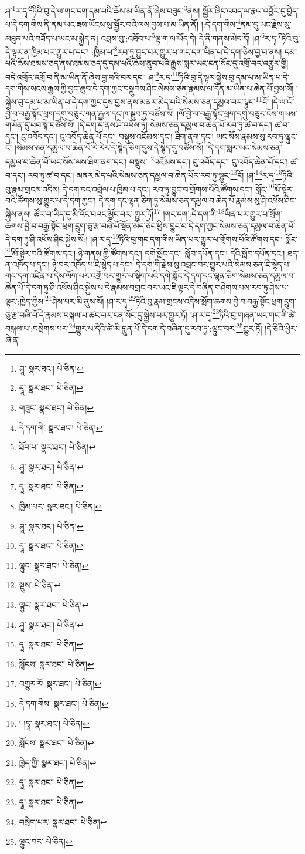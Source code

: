 ཤ་\footnote{ཤཱ་  སྣར་ཐང་།  པེ་ཅིན། }ར་དྭ་\footnote{དྭཱ་  སྣར་ཐང་།  པེ་ཅིན། }ཏིའི་བུ་དེ་ལ་གང་དག་དམ་པའི་ཆོས་མ་ཡིན་ནོ་ཞེས་བཟུང་\footnote{གཟུང་  སྣར་ཐང་།  པེ་ཅིན། }ནས། སྦྱོར་ཞིང་འབད་ལ་རྣལ་འབྱོར་དུ་བྱེད་པ་དེ་དག་གིས་ནི་ནམ་ཡང་ཟས་ཡོངས་སུ་སྦྱོར་བའི་ལས་བྱས་པ་མ་ཡིན་ནོ། །:དེ་དག་གིས་\footnote{དེ་དག་གི་  སྣར་ཐང་།  པེ་ཅིན། }ནམ་དུ་ཡང་རྗེས་སུ་མཐུན་པའི་བཟོད་པ་ཡང་མ་སྐྱེད་ན། འབྲས་བུ་:འཐོབ་པ་\footnote{ཐོབ་པ་  སྣར་ཐང་།  པེ་ཅིན། }ལྟ་ག་ལ་ཡོད་དེ། དེ་ནི་གནས་མེད་དོ། །ཤ་\footnote{ཤཱ་  སྣར་ཐང་།  པེ་ཅིན། }ར་དྭ་\footnote{དྭཱ་  སྣར་ཐང་།  པེ་ཅིན། }ཏིའི་བུ་དེ་ལྟར་ན་ཁྱིམ་པར་གྱུར་པ་དང་། :ཁྱིམ་པ་\footnote{ཁྱིམ་པར་  སྣར་ཐང་།  པེ་ཅིན། }རབ་ཏུ་བྱུང་བར་གྱུར་པ་གང་དག་ཡིན་པ་དེ་དག་ཅེས་བྱ་བ་ནས། དམ་པའི་ཆོས་ཐམས་ཅད་ནས་ཐམས་ཅད་དུ་དམ་པའི་ཆོས་ནུབ་པའི་རྒྱུས་སླར་ཡང་ངན་སོང་དུ་འགྲོ་བར་འགྱུར་གྱི། བདེ་འགྲོར་འགྲོ་བ་ནི་མ་ཡིན་ནོ་ཞེས་བྱ་བའི་བར་དང་། ཤ་\footnote{ཤཱ་  སྣར་ཐང་།  པེ་ཅིན། }ར་དྭ་\footnote{དྭཱ་  སྣར་ཐང་།  པེ་ཅིན། }ཏིའི་བུ་དེ་ལྟར་སྐྱེས་བུ་དམ་པ་མ་ཡིན་པ་དེ་དག་གིས་སངས་རྒྱས་ཀྱི་བྱང་ཆུབ་དེ་དག་ཀྱང་བསྣུབས་ཤིང་སེམས་ཅན་རྣམས་ལ་དོན་མ་ཡིན་པ་ཆེན་པོ་བྱས་སོ། །སྐྱེས་བུ་དམ་པ་མ་ཡིན་པ་དེ་དག་ཀྱང་དུས་བྱས་ནས་མནར་མེད་པའི་སེམས་ཅན་དམྱལ་བར་ལྟུང་\footnote{ལྷུང་  སྣར་ཐང་།  པེ་ཅིན། }ངོ། །དེ་ལ་ལོ་བྱེ་བ་བརྒྱ་སྟོང་ཕྲག་དགུ་བཅུར་གན་རྐྱལ་དང་ཁ་སྦུབ་ཏུ་བཙོས་སོ། །ལོ་བྱེ་བ་བརྒྱ་སྟོང་ཕྲག་དགུ་བཅུར་ངོས་གཡས་གཡོན་དུ་ཕབ་སྟེ་བཙོས་སོ། །དེ་དག་དེ་ནས་ཤི་འཕོས་ཏེ། སེམས་ཅན་དམྱལ་བ་ཆེན་པོ་རབ་ཏུ་ཚ་བ་དང་། ཚ་བ་དང་། ངུ་འབོད་དང་། ངུ་འབོད་ཆེན་པོ་དང་། བསྡུས་འཇོམས་དང་། ཐིག་ནག་དང་། ཡང་སོས་རྣམས་སུ་རབ་ཏུ་ལྟུང་ངོ། །སེམས་ཅན་དམྱལ་བ་ཆེན་པོ་རེ་རེར་དེ་སྙེད་ཅིག་དུས་དེ་སྙེད་དུ་བཙོས་སོ། །དེ་དག་སླར་ཡང་སེམས་ཅན་དམྱལ་བ་ཆེན་པོ་ཡང་སོས་ལས་ཐིག་ནག་དང་། བསྡུས་\footnote{སྡུས་  པེ་ཅིན། }འཇོམས་དང་། ངུ་འབོད་དང་། ངུ་འབོད་ཆེན་པོ་དང་། ཚ་བ་དང་། རབ་ཏུ་ཚ་བ་དང་། མནར་མེད་པའི་སེམས་ཅན་དམྱལ་བ་ཆེན་པོར་རབ་ཏུ་ལྷུང་\footnote{ལྟུང་  སྣར་ཐང་།  པེ་ཅིན། }ངོ། །ཤ་\footnote{ཤཱ་  སྣར་ཐང་།  པེ་ཅིན། }ར་དྭ་\footnote{དྭཱ་  སྣར་ཐང་།  པེ་ཅིན། }ཏིའི་བུ་རྣམ་གྲངས་འདིས། དེ་དག་དང་འབྲེལ་པ་ཁྱིམ་པ་དང་། རབ་ཏུ་བྱུང་བ་གྲོགས་པོའི་ཚོགས་དང་། སློང་\footnote{སློངས་  སྣར་ཐང་།  པེ་ཅིན། }མོ་སྟེར་བའི་ཚོགས་སུ་གྱུར་པ་དེ་དག་ཀྱང་། དེ་དག་དང་ལྷན་ཅིག་ཏུ་སེམས་ཅན་དམྱལ་བ་ཆེན་པོ་རྣམས་སུ་ཤི་འཕོས་ཤིང་སྐྱེས་ནས། ཚོར་བ་ཡིད་དུ་མི་འོང་བའང་མྱོང་བར་:གྱུར་ཏོ།\footnote{འགྱུར་རོ།  སྣར་ཐང་།  པེ་ཅིན། } །གང་དག་:དེ་དག་གི་\footnote{དེ་དག་གིས་  སྣར་ཐང་།  པེ་ཅིན། }ཡིན་པར་གྱུར་པ་སྲོག་ཆགས་བྱེ་བ་བརྒྱ་སྟོང་ཕྲག་དྲུག་ཅུ་རྩ་བཞི་པོ་སྔོན་མེད་ཅིང་ཕྱིས་བྱུང་བ་དེ་དག་ཀྱང་སེམས་ཅན་དམྱལ་བ་ཆེན་པོ་དེ་དག་ཏུ་ཤི་འཕོས་ཤིང་སྐྱེས་སོ:། །ཤ་ར་དྭ་\footnote{། །དྭཱ་  སྣར་ཐང་།  པེ་ཅིན། }ཏིའི་བུ་གང་དག་གིས་ཡིན་པར་གྱུར་པ་གྲོགས་པོའི་ཚོགས་དང་། སློང་\footnote{སློངས་  སྣར་ཐང་།  པེ་ཅིན། }མོ་སྟེར་བའི་ཚོགས་དང་། ཉེ་གནས་ཀྱི་ཚོགས་དང་། དགེ་སློང་དང་། སློབ་དཔོན་དང་། དེའི་སློབ་དཔོན་དང་། ཐད་ན་འཁོད་པ་དང་། ཉེ་བར་འཁོད་པ་ཇི་སྙེད་པ་དང་། དེ་དག་གི་རྗེས་སུ་འབྲང་བར་གྱུར་པའི་སེམས་ཅན་ཇི་སྙེད་པ་གང་དག་འཛིན་པ་དེས་ལོག་པར་འགྲོ་བར་གྱུར་པ་སྡིག་པའི་དགེ་སློང་དེ་དག་དང་ལྷན་ཅིག་སེམས་ཅན་དམྱལ་བ་ཆེན་པོ་དེ་དག་ཏུ་ཤི་འཕོས་ཤིང་སྐྱེས་པ་དེ་རྣམས་བགྲང་བར་ཡང་ཇི་ལྟར་དེ་བཞིན་གཤེགས་པས་རབ་ཏུ་ཤེས་པ་ལྟར་:ཁྱེད་ཀྱིས་\footnote{ཁྱེད་ཀྱི་  སྣར་ཐང་།  པེ་ཅིན། }ཤེས་པར་མི་ནུས་སོ། །ཤ་ར་དྭ་\footnote{དྭཱ་  སྣར་ཐང་།  པེ་ཅིན། }ཏིའི་བུ་རྣམ་གྲངས་འདིས་སྲོག་ཆགས་བྱེ་བ་བརྒྱ་སྟོང་ཕྲག་དྲུག་ཅུ་རྩ་བཞི་པོ་དེ་རྣམས་བསྐལ་པ་ཚང་བར་ངན་སོང་དུ་སྐྱེས་པར་གྱུར་ཏོ། །ཤ་ར་དྭ་\footnote{དྭཱ་  སྣར་ཐང་།  པེ་ཅིན། }ཏིའི་བུ་གཞན་ཡང་གང་གི་ཚེ་བསྐལ་པ་:བསྲེགས་པར་\footnote{བསྲེག་པར་  སྣར་ཐང་།  པེ་ཅིན། }གྱུར་པ་དེའི་ཚེ་མི་བླུན་པོ་དེ་དག་དེ་བཞིན་དུ་རབ་ཏུ་:ལྟུང་བར་\footnote{ལྷུང་བར་  པེ་ཅིན། }གྱུར་ཏོ། །དེ་ཅིའི་ཕྱིར་ཞེ་ན། 